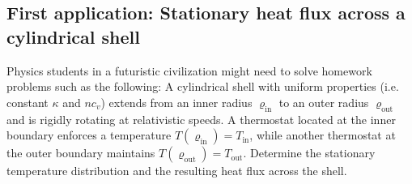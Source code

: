 \documentclass[a4paper, amsfonts, amssymb, amsmath, reprint, showkeys, nofootinbib, twoside, onecolumn,notitlepage]{revtex4-1}
\theoremstyle{definition}
\theoremstyle{theorem}
\begin{document}
\subsection{First application: Stationary heat flux across a cylindrical shell}\label{SectionB}

Physics students in a futuristic civilization might need to solve homework problems such as the following: A cylindrical shell with uniform properties (i.e. constant $\kappa$ and $nc_v$) extends from an inner radius $\varrho_{\text{in}}$ to an outer radius $\varrho_{\text{out}}$ and is rigidly rotating at relativistic speeds. 
A thermostat located at the inner boundary enforces a temperature $T(\varrho_{\text{in}})=T_{\text{in}}$, while another thermostat at the outer boundary maintains $T(\varrho_{\text{out}})=T_{\text{out}}$. Determine the stationary temperature distribution and the resulting heat flux across the shell.
\end{document}
